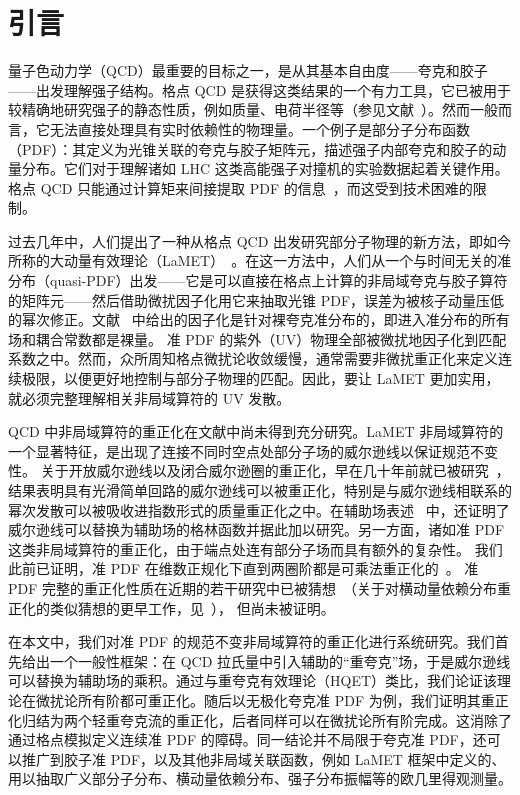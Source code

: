 \section{引言}

量子色动力学（QCD）最重要的目标之一，是从其基本自由度——夸克和胶子——出发理解强子结构。格点 QCD 是获得这类结果的一个有力工具，它已被用于较精确地研究强子的静态性质，例如质量、电荷半径等（参见文献~\cite{Edwards:2012fx,Aoki:2016frl}）。然而一般而言，它无法直接处理具有实时依赖性的物理量。一个例子是部分子分布函数（PDF）：其定义为光锥关联的夸克与胶子矩阵元，描述强子内部夸克和胶子的动量分布。它们对于理解诸如 LHC 这类高能强子对撞机的实验数据起着关键作用。格点 QCD 只能通过计算矩来间接提取 PDF 的信息~\cite{Detmold:2001jb,Dolgov:2002zm}，而这受到技术困难的限制。

过去几年中，人们提出了一种从格点 QCD 出发研究部分子物理的新方法，即如今所称的大动量有效理论（LaMET）~\cite{Ji:2013dva,Ji:2014gla}。在这一方法中，人们从一个与时间无关的准分布（quasi-PDF）出发——它是可以直接在格点上计算的非局域夸克与胶子算符的矩阵元——然后借助微扰因子化用它来抽取光锥 PDF，误差为被核子动量压低的幂次修正。文献~\cite{Ji:2013dva,Xiong:2013bka} 中给出的因子化是针对裸夸克准分布的，即进入准分布的所有场和耦合常数都是裸量。
准 PDF 的紫外（UV）物理全部被微扰地因子化到匹配系数之中。然而，众所周知格点微扰论收敛缓慢，通常需要非微扰重正化来定义连续极限，以便更好地控制与部分子物理的匹配。因此，要让 LaMET 更加实用，就必须完整理解相关非局域算符的 UV 发散。

QCD 中非局域算符的重正化在文献中尚未得到充分研究。LaMET 非局域算符的一个显著特征，是出现了连接不同时空点处部分子场的威尔逊线以保证规范不变性。
关于开放威尔逊线以及闭合威尔逊圈的重正化，早在几十年前就已被研究~\cite{Dotsenko:1979wb,Craigie:1980qs,Dorn:1986dt}，结果表明具有光滑简单回路的威尔逊线可以被重正化，特别是与威尔逊线相联系的幂次发散可以被吸收进指数形式的质量重正化之中。在辅助场表述~\cite{Dorn:1986dt} 中，还证明了威尔逊线可以替换为辅助场的格林函数并据此加以研究。另一方面，诸如准 PDF 这类非局域算符的重正化，由于端点处连有部分子场而具有额外的复杂性。
我们此前已证明，准 PDF 在维数正规化下直到两圈阶都是可乘法重正化的~\cite{Ji:2015jwa}。
准 PDF 完整的重正化性质在近期的若干研究中已被猜想~\cite{Ishikawa:2016znu,Chen:2016fxx,Constantinou:2017sej,Alexandrou:2017huk,Chen:2017mzz,Stewart:2017ss}（关于对横动量依赖分布重正化的类似猜想的更早工作，见~\cite{Musch:2010ka}），
但尚未被证明。

在本文中，我们对准 PDF 的规范不变非局域算符的重正化进行系统研究。我们首先给出一个一般性框架：在 QCD 拉氏量中引入辅助的“重夸克”场，于是威尔逊线可以替换为辅助场的乘积。通过与重夸克有效理论（HQET）类比，我们论证该理论在微扰论所有阶都可重正化。随后以无极化夸克准 PDF 为例，我们证明其重正化归结为两个轻重夸克流的重正化，后者同样可以在微扰论所有阶完成。这消除了通过格点模拟定义连续准 PDF 的障碍。同一结论并不局限于夸克准 PDF，还可以推广到胶子准 PDF，以及其他非局域关联函数，例如 LaMET 框架中定义的、用以抽取广义部分子分布、横动量依赖分布、强子分布振幅等的欧几里得观测量。
